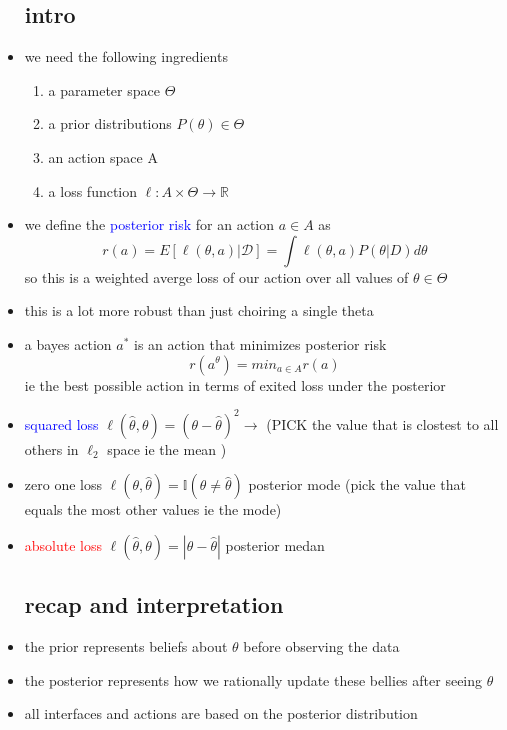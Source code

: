 \documentclass{article}
\begin{document}
\begin{itemize}
\subsection*{intro}
\item we need the following ingredients 
\begin{enumerate}
    \item a parameter space $\Theta$
    \item a prior distributions $P(\theta)\in \Theta$
    \item an action space A
    \item a loss function $\ell:A\times \Theta \rightarrow \mathbb{R}$
\end{enumerate}
\item we define the \textcolor{blue}{posterior risk} for an action $a\in A$ as $$r(a)=E[\ell(\theta,a)|\mathcal{D}]=\int\ell(\theta, a)P(\theta|D)d\theta$$ so this is a weighted averge loss of our action over all values of $\theta\in \Theta$
\item this is a lot more robust than just choiring a single theta
\item a bayes action $a^{*}$ is an action that minimizes posterior risk $$r(a^{\theta})=min_{a\in A}r(a)$$ ie the best possible action in terms of exited loss under the posterior
\item \textcolor{blue}{squared loss} $\ell(\hat{\theta}, \theta)=(\theta-\hat{\theta})^{2}\rightarrow $ (PICK the value that is clostest to all others in $\ell_{2}$ space ie the mean )
\item zero one loss $\ell(\theta, \hat{\theta})=\mathbb{I}(\theta\neq \hat{\theta})$ posterior mode (pick the value that equals the most other values ie the mode)
\item \textcolor{red}{absolute loss} $\ell(\hat{\theta}, \theta)=|\theta- \hat{\theta}|$ posterior medan 
\subsection*{recap and interpretation}
\item the prior represents beliefs about $\theta$ before observing the data 
\item the posterior represents how we rationally update these bellies after seeing $\theta$ 
\item all interfaces and actions are based on the posterior distribution

\end{itemize}
\end{document}
